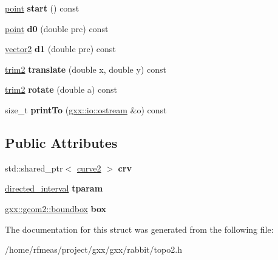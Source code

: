 \begin{DoxyCompactItemize}
\item 
\hyperlink{classmalgo_1_1vector2}{point} {\bfseries start} () const \hypertarget{structrabbit_1_1trim2_af6bf701b9b1eb725c7fbdec7527dbbfc}{}\label{structrabbit_1_1trim2_af6bf701b9b1eb725c7fbdec7527dbbfc}

\item 
\hyperlink{classmalgo_1_1vector2}{point} {\bfseries d0} (double prc) const \hypertarget{structrabbit_1_1trim2_aece0eb1e4c0c2a8a87fe7874ec93fc5e}{}\label{structrabbit_1_1trim2_aece0eb1e4c0c2a8a87fe7874ec93fc5e}

\item 
\hyperlink{classmalgo_1_1vector2}{vector2} {\bfseries d1} (double prc) const \hypertarget{structrabbit_1_1trim2_acecfe6cb29c0c4bd9ba32f4ca6bed560}{}\label{structrabbit_1_1trim2_acecfe6cb29c0c4bd9ba32f4ca6bed560}

\item 
\hyperlink{structrabbit_1_1trim2}{trim2} {\bfseries translate} (double x, double y) const \hypertarget{structrabbit_1_1trim2_a0493d5ee83ffebc90aa6ac82958a45e0}{}\label{structrabbit_1_1trim2_a0493d5ee83ffebc90aa6ac82958a45e0}

\item 
\hyperlink{structrabbit_1_1trim2}{trim2} {\bfseries rotate} (double a) const \hypertarget{structrabbit_1_1trim2_af5b7c73dd2a0541fc4f7047adf1a0369}{}\label{structrabbit_1_1trim2_af5b7c73dd2a0541fc4f7047adf1a0369}

\item 
size\+\_\+t {\bfseries print\+To} (\hyperlink{classgxx_1_1io_1_1ostream}{gxx\+::io\+::ostream} \&o) const \hypertarget{structrabbit_1_1trim2_a97e754434655af9c5bfcf272ff74665d}{}\label{structrabbit_1_1trim2_a97e754434655af9c5bfcf272ff74665d}

\end{DoxyCompactItemize}
\subsection*{Public Attributes}
\begin{DoxyCompactItemize}
\item 
std\+::shared\+\_\+ptr$<$ \hyperlink{classgxx_1_1geom2_1_1curve}{curve2} $>$ {\bfseries crv}\hypertarget{structrabbit_1_1trim2_af1d71182421bf8fffd438cf3b19dbb2e}{}\label{structrabbit_1_1trim2_af1d71182421bf8fffd438cf3b19dbb2e}

\item 
\hyperlink{structgxx_1_1math_1_1directed__interval}{directed\+\_\+interval} {\bfseries tparam}\hypertarget{structrabbit_1_1trim2_a95dd8d1eb62b968ef23e83e136f38317}{}\label{structrabbit_1_1trim2_a95dd8d1eb62b968ef23e83e136f38317}

\item 
\hyperlink{structgxx_1_1geom2_1_1boundbox}{gxx\+::geom2\+::boundbox} {\bfseries box}\hypertarget{structrabbit_1_1trim2_ac552b9a45c107bfde76b365652508f5a}{}\label{structrabbit_1_1trim2_ac552b9a45c107bfde76b365652508f5a}

\end{DoxyCompactItemize}


The documentation for this struct was generated from the following file\+:\begin{DoxyCompactItemize}
\item 
/home/rfmeas/project/gxx/gxx/rabbit/topo2.\+h\end{DoxyCompactItemize}
